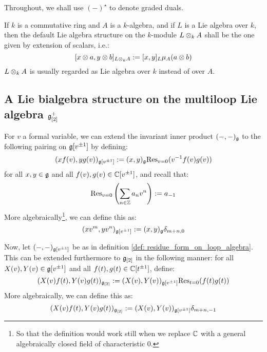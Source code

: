         \begin{convention}
            Throughout, we shall use $(-)^{\star}$ to denote graded duals. 
        \end{convention}

        \begin{convention}
            If $k$ is a commutative ring and $A$ is a $k$-algebra, and if $L$ is a Lie algebra over $k$, then the default Lie algebra structure on the $k$-module $L \tensor_k A$ shall be the one given by extension of scalars, i.e.:
                $$[x \tensor a, y \tensor b]_{L \tensor_k A} := [x, y]_L \mu_A(a \tensor b)$$
            $L \tensor_k A$ is usually regarded as Lie algebra over $k$ instead of over $A$.  
        \end{convention}
    
        \subsection{A Lie bialgebra structure on the multiloop Lie algebra \texorpdfstring{$\mathfrak{g}_{[2]}^+$}{}}
            \begin{definition} \label{def: residue_form_on_loop_algebra}
                For $v$ a formal variable, we can extend the invariant inner product $(-, -)_{\mathfrak{g}}$ to the following pairing on $\mathfrak{g}[v^{\pm 1}]$ by defining:
                    $$(x f(v), y g(v))_{\mathfrak{g}[v^{\pm 1}]} := (x, y)_{\mathfrak{g}} \mathrm{Res}_{v = 0}( v^{-1} f(v) g(v) )$$
                for all $x, y \in \mathfrak{g}$ and all $f(v), g(v) \in \mathbb{C}[v^{\pm 1}]$, and recall that:
                    $$\mathrm{Res}_{v = 0}\left( \sum_{n \in \mathbb{Z}} a_n v^n \right) := a_{-1}$$
                More algebraically\footnote{So that the definition would work still when we replace $\mathbb{C}$ with a general algebraically closed field of characteristic $0$.}, we can define this as:
                    $$(x v^m, y v^n)_{\mathfrak{g}[v^{\pm 1}]} := (x, y)_{\mathfrak{g}} \delta_{m + n, 0}$$
            \end{definition}
            \begin{definition} \label{def: residue_form_on_multi_loop_algebra}
                Now, let $(-, -)_{\mathfrak{g}[v^{\pm 1}]}$ be as in definition \ref{def: residue_form_on_loop_algebra}. This can be extended furthermore to $\mathfrak{g}_{[2]}$ in the following manner: for all $X(v), Y(v) \in \mathfrak{g}[v^{\pm 1}]$ and all $f(t), g(t) \in \mathbb{C}[t^{\pm 1}]$, define:
                    $$(X(v) f(t), Y(v) g(t))_{\mathfrak{g}_{[2]}} := (X(v), Y(v))_{\mathfrak{g}[v^{\pm 1}]} \mathrm{Res}_{t = 0}( f(t) g(t) )$$
                More algebraically, we can define this as:
                    $$(X(v) f(t), Y(v) g(t))_{\mathfrak{g}_{[2]}} := (X(v), Y(v))_{\mathfrak{g}[v^{\pm 1}]} \delta_{m + n, -1}$$
            \end{definition}

